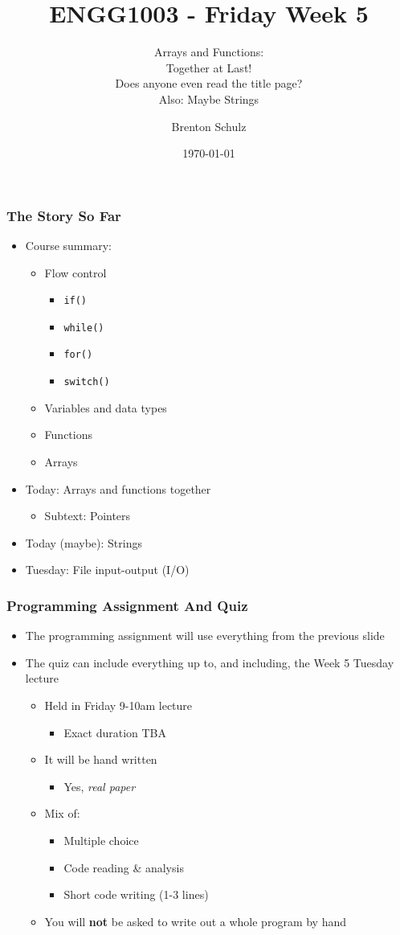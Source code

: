 \documentclass[14pt]{beamer}
\title{ENGG1003 - Friday Week 5}
\subtitle{Arrays and Functions:\\Together at Last!\\{\tiny{Does anyone even read the title page?}}\\Also: Maybe Strings}
\author{Brenton Schulz}
\institute{University of Newcastle}
\date{\today}
\begin{document}
\titlepage

\begin{frame}
\frametitle{The Story So Far}
\begin{itemize}
\item Course summary:
	\begin{itemize}
		\item Flow control
			\begin{itemize}
				\item \texttt{if()}
				\item \texttt{while()}
				\item \texttt{for()}
				\item \texttt{switch()}
			\end{itemize}
		\item Variables and data types
		\item Functions
		\item Arrays
	\end{itemize}
\item Today: Arrays and functions together
	\begin{itemize}
		\item Subtext: Pointers
	\end{itemize}
\item Today (maybe): Strings
\item Tuesday: File input-output (I/O)
\end{itemize}
\end{frame}

\begin{frame}
\frametitle{Programming Assignment And Quiz}
\begin{itemize}
\item The programming assignment will use everything from the previous slide
\item The quiz can include everything up to, and including, the Week 5 Tuesday lecture
	\begin{itemize}
		\item Held in Friday 9-10am lecture
			\begin{itemize}
				\item Exact duration TBA
			\end{itemize}
		\item It will be hand written
			\begin{itemize}
				\item Yes, \textit{real paper}
			\end{itemize}
		\item Mix of:
			\begin{itemize}
				\item Multiple choice
				\item Code reading \& analysis
				\item Short code writing (1-3 lines)
			\end{itemize}
		\item You will \textbf{not} be asked to write out a whole program by hand
	\end{itemize}
\end{itemize}
\end{frame}
\end{document}
